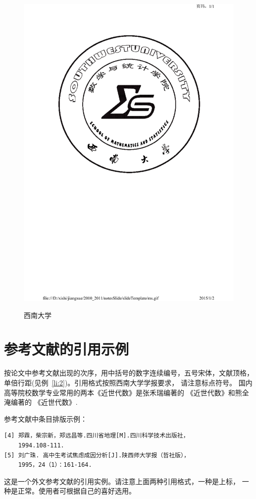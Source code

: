 \begin{figure}
{{{\includegraphics{preample/ms}\label{fig:22}
}}}\\
\caption{西南大学}
\end{figure}
\section{参考文献的引用示例}\label{sec_si4}
按论文中参考文献出现的次序，用中括号的数字连续编号，五号宋体，文献顶格，单倍行距(见例~\ref{li:2})。引用格式按照西南大学学报要求，
请注意标点符号。
国内高等院校数学专业常用的两本《近世代数》是张禾瑞编著的
《近世代数》\cite{zhang}和熊全淹编著的 《近世代数》\cite{xiong}.
\begin{example}\label{li:2}
参考文献中条目排版示例：
\begin{verbatim}
[4] 郑霖，柴宗新，郑远昌等.四川省地理[M].四川科学技术出版社，
    1994.108-111.
[5] 刘广珠. 高中生考试焦虑成因分析[J].陕西师大学报（哲社版），
    1995，24（1）：161-164.
\end{verbatim}
\end{example}
这是一个外文参考文献的引用实例。请注意上面两种引用格式，一种是上标， 一种是正常。使用者可根据自己的喜好选用。

